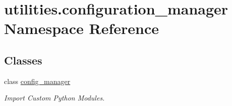 \hypertarget{namespaceutilities_1_1configuration__manager}{}\section{utilities.\+configuration\+\_\+manager Namespace Reference}
\label{namespaceutilities_1_1configuration__manager}
\subsection*{Classes}
\begin{DoxyCompactItemize}
\item 
class \hyperlink{classutilities_1_1configuration__manager_1_1config__manager}{config\+\_\+manager}
\begin{DoxyCompactList}\small\item\em Import Custom Python Modules. \end{DoxyCompactList}\end{DoxyCompactItemize}
